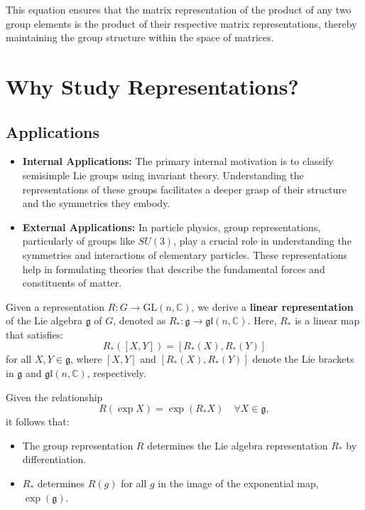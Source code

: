 \documentclass{article}
\begin{document}
This equation ensures that the matrix representation of the product of any two group elements is the product of their respective matrix representations, thereby maintaining the group structure within the space of matrices.

\section*{Why Study Representations?}

\subsection*{Applications}
\begin{itemize}
    \item \textbf{Internal Applications:} The primary internal motivation is to classify semisimple Lie groups using invariant theory. Understanding the representations of these groups facilitates a deeper grasp of their structure and the symmetries they embody.
    \item \textbf{External Applications:} In particle physics, group representations, particularly of groups like \( SU(3) \), play a crucial role in understanding the symmetries and interactions of elementary particles. These representations help in formulating theories that describe the fundamental forces and constituents of matter.
\end{itemize}

Given a representation \( R: G \to \mathrm{GL}(n, \mathbb{C}) \), we derive a \textbf{linear representation} of the Lie algebra \( \mathfrak{g} \) of \( G \), denoted as \( R_*: \mathfrak{g} \to \mathfrak{gl}(n, \mathbb{C}) \). Here, \( R_* \) is a linear map that satisfies:
\[
R_*([X, Y]) = [R_*(X), R_*(Y)]
\]
for all \( X, Y \in \mathfrak{g} \), where \([X, Y]\) and \([R_*(X), R_*(Y)]\) denote the Lie brackets in \( \mathfrak{g} \) and \( \mathfrak{gl}(n, \mathbb{C}) \), respectively.

Given the relationship 
\[
R(\exp X) = \exp(R_* X) \quad \forall X \in \mathfrak{g},
\]
it follows that:
\begin{itemize}
    \item The group representation \( R \) determines the Lie algebra representation \( R_* \) by differentiation.
    \item \( R_* \) determines \( R(g) \) for all \( g \) in the image of the exponential map, \(\exp(\mathfrak{g})\).
\end{itemize}
\end{document}
